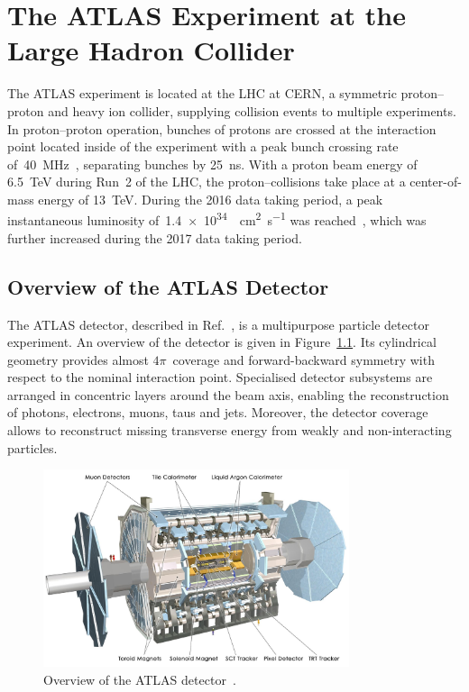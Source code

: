 \chapter{The ATLAS Experiment at the Large Hadron Collider}
\label{chap:atlas}

The ATLAS experiment is located at the LHC at CERN, a symmetric proton--proton
and heavy ion collider, supplying collision events to multiple experiments. In
proton--proton operation, bunches of protons are crossed at the interaction
point located inside of the experiment with a peak bunch crossing rate
of~\SI{40}{\mega\hertz}~\cite{lhc}, separating bunches by \SI{25}{\nano\second}.
With a proton beam energy of \SI{6.5}{\TeV} during Run~2 of the LHC, the
proton--collisions take place at a center-of-mass energy of \SI{13}{\TeV}.
During the 2016 data taking period, a peak instantaneous luminosity
of~\SI{1.4e34}{\per\square\centi\metre\per\second} was
reached~\cite{lhc_2016_report}, which was further increased during the 2017 data
taking period.

\section{Overview of the ATLAS Detector}
\label{sec:atlas}

The ATLAS detector, described in Ref.\ \cite{atlas_detector}, is a multipurpose
particle detector experiment. An overview of the detector is given in
Figure~\ref{fig:atlas_detector}. Its cylindrical geometry provides almost
$4\pi$~coverage and forward-backward symmetry with respect to the nominal
interaction point. Specialised detector subsystems are arranged in concentric
layers around the beam axis, enabling the reconstruction of photons, electrons,
muons, taus and jets. Moreover, the detector coverage allows to reconstruct
missing transverse energy from weakly and non-interacting particles.

\begin{figure}[htb]
  \centering
  \includegraphics[width=0.8\textwidth]{./figures/atlas/overview.jpg}
  \caption[Overview of the ATLAS detector]{Overview of the ATLAS
    detector~\cite{atlas_detector}.}
  \label{fig:atlas_detector}
\end{figure}

